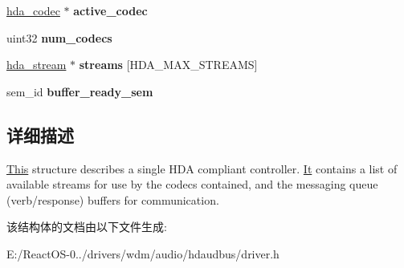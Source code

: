 \begin{DoxyCompactItemize}
\hyperlink{structhda__codec}{hda\+\_\+codec} $\ast$ {\bfseries active\+\_\+codec}
\item 
\mbox{\label{structhda__controller_a49f5a4600f1bc8fdae43bcd9f4ad9329}} 
uint32 {\bfseries num\+\_\+codecs}
\item 
\mbox{\label{structhda__controller_ae9c7db241b051f46615478074bf7e4c0}} 
\hyperlink{structhda__stream}{hda\+\_\+stream} $\ast$ {\bfseries streams} \mbox{[}H\+D\+A\+\_\+\+M\+A\+X\+\_\+\+S\+T\+R\+E\+A\+MS\mbox{]}
\item 
\mbox{\label{structhda__controller_a627c91fe68b546b04b93889520d90fd2}} 
sem\+\_\+id {\bfseries buffer\+\_\+ready\+\_\+sem}
\end{DoxyCompactItemize}


\subsection{详细描述}
\hyperlink{namespace_this}{This} structure describes a single H\+DA compliant controller. \hyperlink{class_it}{It} contains a list of available streams for use by the codecs contained, and the messaging queue (verb/response) buffers for communication. 

该结构体的文档由以下文件生成\+:\begin{DoxyCompactItemize}
\item 
E\+:/\+React\+O\+S-\/0../drivers/wdm/audio/hdaudbus/driver.\+h\end{DoxyCompactItemize}

